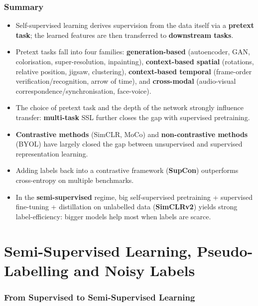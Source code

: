 \documentclass[11pt,a4paper]{article}
\theoremstyle{definition}
\theoremstyle{plain}
\theoremstyle{remark}
\begin{document}
\section{Summary}

\begin{tcolorbox}[colback=yellow!5!white,colframe=orange!80!black,title=\textbf{Take-Home Messages}]
\begin{itemize}[leftmargin=*]
    \item Self-supervised learning derives supervision from the data itself via a \textbf{pretext task}; the learned features are then transferred to \textbf{downstream tasks}.
    \item Pretext tasks fall into four families: \textbf{generation-based} (autoencoder, GAN, colorisation, super-resolution, inpainting), \textbf{context-based spatial} (rotations, relative position, jigsaw, clustering), \textbf{context-based temporal} (frame-order verification/recognition, arrow of time), and \textbf{cross-modal} (audio-visual correspondence/synchronisation, face-voice).
    \item The choice of pretext task and the depth of the network strongly influence transfer: \textbf{multi-task} SSL further closes the gap with supervised pretraining.
    \item \textbf{Contrastive methods} (SimCLR, MoCo) and \textbf{non-contrastive methods} (BYOL) have largely closed the gap between unsupervised and supervised representation learning.
    \item Adding labels back into a contrastive framework (\textbf{SupCon}) outperforms cross-entropy on multiple benchmarks.
    \item In the \textbf{semi-supervised} regime, big self-supervised pretraining + supervised fine-tuning + distillation on unlabelled data (\textbf{SimCLRv2}) yields strong label-efficiency: bigger models help most when labels are scarce.
\end{itemize}
\end{tcolorbox}



\part{Semi-Supervised Learning, Pseudo-Labelling and Noisy Labels}

\section{From Supervised to Semi-Supervised Learning}
\end{document}
